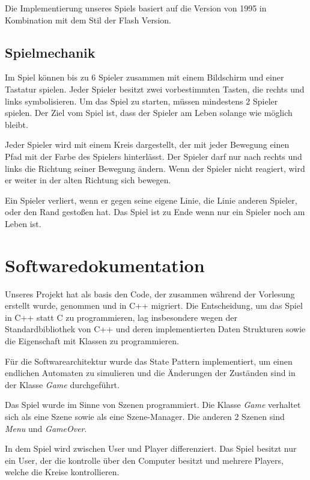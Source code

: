 \documentclass[doktyp=studarbeit]{TUBAFarbeiten}
\begin{document}
Die Implementierung unseres Spiels basiert auf die Version von 1995 in 
Kombination mit dem Stil der Flash Version.

\subsection{Spielmechanik}

Im Spiel können bis zu 6 Spieler zusammen mit einem Bildschirm und einer 
Tastatur spielen. Jeder Spieler besitzt zwei vorbestimmten Tasten, die rechts 
und links symbolisieren. Um das Spiel zu starten, müssen mindestens 
2 Spieler spielen.  Der Ziel vom Spiel ist, dass der Spieler am Leben 
solange wie möglich bleibt.

Jeder Spieler wird mit einem Kreis dargestellt, der mit jeder Bewegung einen 
Pfad mit der Farbe des Spielers hinterlässt. Der Spieler darf nur nach rechts 
und links die Richtung seiner Bewegung ändern. Wenn der Spieler nicht reagiert, 
wird er weiter in der alten Richtung sich bewegen.

Ein Spieler verliert, wenn er gegen seine eigene Linie, die Linie anderen 
Spieler,  oder den Rand gestoßen hat. Das Spiel ist zu Ende wenn nur ein 
Spieler noch am Leben ist.

\section{Softwaredokumentation}

Unseres Projekt hat als basis den Code, der zusammen während der Vorlesung 
erstellt wurde, genommen und in C++ migriert. 
Die Entscheidung, um das Spiel in C++ statt C zu programmieren, lag 
insbesondere wegen der Standardbibliothek von C++ und deren implementierten 
Daten Strukturen sowie die Eigenschaft mit Klassen zu programmieren.

Für die Softwarearchitektur wurde das State Pattern implementiert, um einen 
endlichen Automaten zu simulieren und die Änderungen der Zuständen sind in der 
Klasse \textit{Game} durchgeführt.

Das Spiel wurde im Sinne von Szenen programmiert. Die Klasse \textit{Game}
verhaltet sich als eine Szene sowie als eine Szene-Manager. Die anderen
2 Szenen sind \textit{Menu} und \textit{GameOver}.

In dem Spiel wird zwischen User und Player differenziert. Das Spiel besitzt nur
ein User, der die kontrolle über den Computer besitzt und mehrere Players, 
welche die Kreise kontrollieren.
\end{document}
